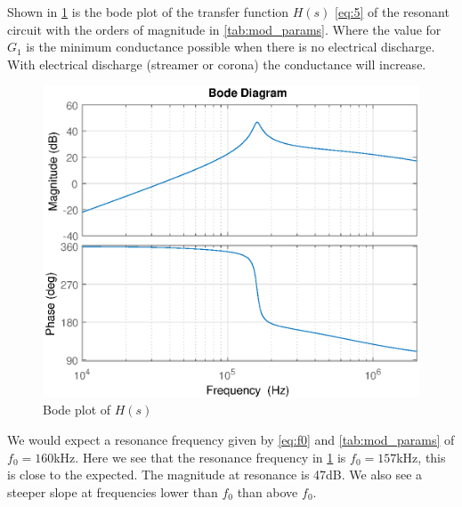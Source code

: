 Shown in \cref{fig:bode} is the bode plot of the transfer function $H(s)$ \cref{eq:5} of the resonant circuit with the orders of magnitude in \cref{tab:mod_params}. Where the value for $G_1$ is the minimum conductance possible when there is no electrical discharge. With electrical discharge (streamer or corona) the conductance will increase.

\begin{figure}[H]
    \centering
    \includegraphics[width=\textwidth]{img/CoilRigBode.eps}
    \caption{Bode plot of $H(s)$}
    \label{fig:bode}
\end{figure}

We would expect a resonance frequency given by \cref{eq:f0} and \cref{tab:mod_params} of $f_0 = 160$kHz. Here we see that the resonance frequency in \cref{fig:bode} is $f_0 = 157$kHz, this is close to the expected. The magnitude at resonance is 47dB. We also see a steeper slope at frequencies lower than $f_0$ than above $f_0$.




